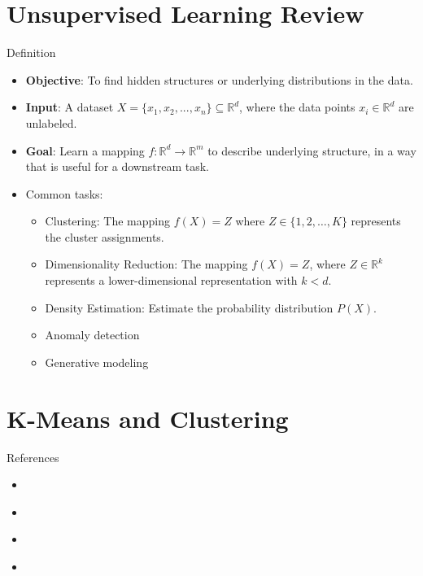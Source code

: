 \documentclass[serif, aspectratio=169]{beamer}
\begin{document}
\section{Unsupervised Learning Review}
\begin{frame}{Definition}
    \begin{itemize}
        \item \textbf{Objective}: To find hidden structures or underlying distributions in the data.
        \item \textbf{Input}: A dataset \( X = \{x_1, x_2, ..., x_n\} \subseteq \mathbb{R}^d \), where the data points \( x_i \in \mathbb{R}^d \) are unlabeled.
        \item \textbf{Goal}: Learn a mapping \( f: \mathbb{R}^d \to \mathbb{R}^m \) to describe underlying structure, in a way that is useful for a downstream task.
        \item Common tasks: 
        \begin{itemize}
            \item Clustering: The mapping \( f(X) = Z \) where \( Z \in \{1, 2, \dots, K\} \) represents the cluster assignments.
        
        \item Dimensionality Reduction: The mapping \( f(X) = Z \), where \( Z \in \mathbb{R}^k \) represents a lower-dimensional representation with \( k < d \).
        
        \item Density Estimation: Estimate the probability distribution \( P(X) \).
        \item Anomaly detection
        \item Generative modeling
        \end{itemize}
    \end{itemize}
\end{frame}

\section{K-Means and Clustering}
\begin{frame}{References}
    \begin{itemize}
        \item \cite{M2006-mk}
        \item \cite{MITNeuroscienceLecture2014}
        \item \cite{SontagMLLecture2012}
        \item \cite{soleymaniMLCourse}
        
    \end{itemize}
\end{frame}
\end{document}
